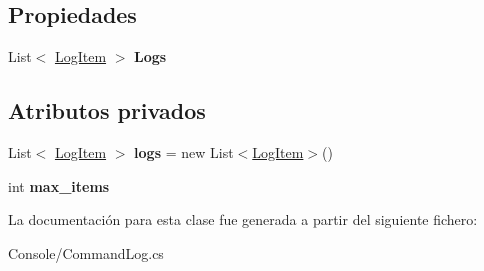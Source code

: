 \subsection*{Propiedades}
\begin{DoxyCompactItemize}
\item 
\mbox{\label{class_command_terminal_1_1_command_log_a856e252795994b69fbe9448a3ea9efc8}} 
List$<$ \mbox{\hyperlink{struct_command_terminal_1_1_log_item}{Log\+Item}} $>$ {\bfseries Logs}
\end{DoxyCompactItemize}
\subsection*{Atributos privados}
\begin{DoxyCompactItemize}
\item 
\mbox{\label{class_command_terminal_1_1_command_log_a4c03b559f893405d8177b7c1ef201f6f}} 
List$<$ \mbox{\hyperlink{struct_command_terminal_1_1_log_item}{Log\+Item}} $>$ {\bfseries logs} = new List$<$\mbox{\hyperlink{struct_command_terminal_1_1_log_item}{Log\+Item}}$>$()
\item 
\mbox{\label{class_command_terminal_1_1_command_log_a85154c04a328727d47044c1466b2c737}} 
int {\bfseries max\+\_\+items}
\end{DoxyCompactItemize}


La documentación para esta clase fue generada a partir del siguiente fichero\+:\begin{DoxyCompactItemize}
\item 
Console/Command\+Log.\+cs\end{DoxyCompactItemize}
